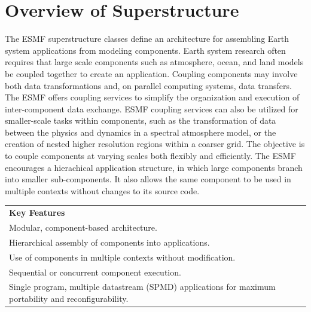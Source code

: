 %

\section{Overview of Superstructure}

The ESMF superstructure classes define an architecture for assembling
Earth system applications from modeling components.  Earth system research 
often requires that large scale components such as atmosphere, ocean,
and land models be coupled together to create an application.  
Coupling components may involve both data transformations and, on 
parallel computing systems, data transfers.  The ESMF offers coupling 
services to simplify the organization and execution of inter-component 
data exchange.  ESMF coupling services can also be utilized for 
smaller-scale tasks within components, such as the 
transformation of data between the physics and dynamics in a spectral 
atmosphere model, or the creation of nested higher resolution regions 
within a coarser grid.  The objective is to couple components at varying 
scales both flexibly and efficiently.  The ESMF encourages a hierachical
application structure, in which large components branch into 
smaller sub-components.  It also allows the same component to be 
used in multiple contexts without changes to its source code.

\begin{center}  
\begin{tabular}{|p{6in}|}
\hline
\vspace{.01in}
{\bf Key Features} \\[.01in]
Modular, component-based architecture. \\
Hierarchical assembly of components into applications.\\
Use of components in multiple contexts without modification.\\
Sequential or concurrent component execution.\\
Single program, multiple datastream (SPMD) applications for 
maximum portability and reconfigurability.\\[.03in] \hline
\end{tabular}
\end{center}

